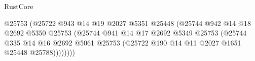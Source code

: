 \begin{lexlean}{RustCore}
\begin{coremodule}
                                                            @25753
                                                            (@25722
                                                              @943
                                                              @14
                                                              @19
                                                              @2027
                                                              @5351
                                                              @25448
                                                              (@25744
                                                                @942
                                                                @14
                                                                @18
                                                                @2692
                                                                @5350
                                                                @25753
                                                                (@25744
                                                                  @941
                                                                  @14
                                                                  @17
                                                                  @2692
                                                                  @5349
                                                                  @25753
                                                                  (@25744
                                                                    @335
                                                                    @14
                                                                    @16
                                                                    @2692
                                                                    @5061
                                                                    @25753
                                                                    (@25722
                                                                      @190
                                                                      @14
                                                                      @11
                                                                      @2027
                                                                      @1651
                                                                      @25448
                                                                      @25788))))))))

\end{coremodule}
\end{lexlean}
